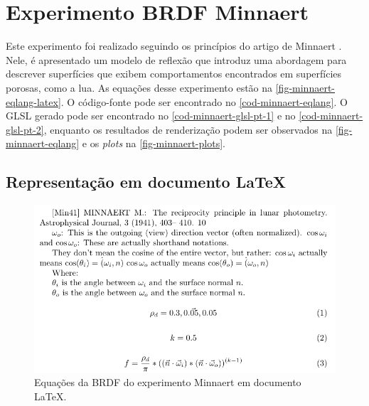 \section{Experimento BRDF Minnaert}
\label{section-experiment-minnaert}

Este experimento foi realizado seguindo os princípios do artigo de Minnaert \cite{minnaert1941reciprocity}. Nele, é apresentado um modelo de reflexão que introduz uma abordagem para descrever superfícies que exibem comportamentos encontrados em superfícies porosas, como a lua. As equações desse experimento estão na \autoref{fig-minnaert-eqlang-latex}. O código-fonte pode ser encontrado no \autoref{cod-minnaert-eqlang}. O GLSL gerado pode ser encontrado no \autoref{cod-minnaert-glsl-pt-1} e no \autoref{cod-minnaert-glsl-pt-2}, enquanto os resultados de renderização podem ser observados na \autoref{fig-minnaert-eqlang} e os \textit{plots} na \autoref{fig-minnaert-plots}.


\subsection{Representação em documento \LaTeX{}}
\begin{figure}[H]
    \caption{\label{fig-minnaert-eqlang-latex} \small Equações da BRDF do experimento Minnaert em documento \LaTeX{}.}
    \begin{center}
        \includegraphics[scale=0.92]{./Imagens/brdfs/minnaert.pdf}
    \end{center}
\end{figure}

